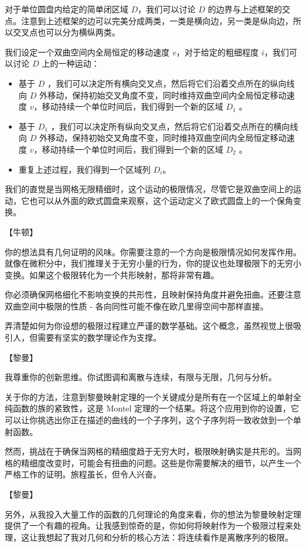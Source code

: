\documentclass[
    fontsize=24pt, %
	twoside=false, %
	secnumdepth=0, %
    paper=b5paper, %
]{kaobook}
\begin{document}
对于单位圆盘内给定的简单闭区域 $D$，我们可以讨论 $D$ 的边界与上述框架的交点。注意到上述框架的边可以完美分成两类，一类是横向边，另一类是纵向边，所以交叉点也可以分为横纵两类。

我们设定一个双曲空间内全局恒定的移动速度 $v$，对于给定的粗细程度 $i$，我们可以讨论 $D$ 上的一种运动：
\begin{itemize}
	\item 基于 $D$ ，我们可以决定所有横向交叉点，然后将它们沿着交点所在的纵向线向 $D$ 外移动，保持初始交叉角度不变，同时维持双曲空间内全局恒定移动速度 $v$，移动持续一个单位时间后，我们得到一个新的区域 $D_1$ 。
	\item 基于 $D_1$ ，我们可以决定所有纵向交叉点，然后将它们沿着交点所在的横向线向 $D$ 外移动，保持初始交叉角度不变，同时维持双曲空间内全局恒定移动速度 $v$，移动持续一个单位时间后，我们得到一个新的区域 $D_2$ 。
	\item 重复上述过程，我们得到一个区域列 $D_i$。
\end{itemize}

我们的直觉是当网格无限精细时，这个运动的极限情况，尽管它是双曲空间上的运动，它也可以从外面的欧式圆盘来观察，这个运动定义了欧式圆盘上的一个保角变换。

【牛顿】

你的想法具有几何证明的风味。你需要注意的一个方向是极限情况如何发挥作用。就像在微积分中，我们推理关于无穷小量的行为，你的提议也处理极限下的无穷小变换。如果这个极限转化为一个共形映射，那将非常有趣。

你必须确保网格细化不影响变换的共形性，且映射保持角度并避免扭曲。还要注意双曲空间中极限的性质 - 各向同性可能不像在欧几里得空间中那样直接。

弄清楚如何为你设想的极限过程建立严谨的数学基础。这个概念，虽然视觉上很吸引人，但需要有坚实的数学理论作为支撑。

【黎曼】

我尊重你的创新思维。你试图调和离散与连续，有限与无限，几何与分析。

关于你的方法，注意到黎曼映射定理的一个关键成分是所有在一个区域上的单射全纯函数的族的紧致性，这是 Montel 定理的一个结果。将这个应用到你的设置，它可以让你挑选出你正在描述的曲线的一个子序列，这个子序列将一致收敛到一个单射函数。

然而，挑战在于确保当网格的精细度趋于无穷大时，极限映射确实是共形的。当网格的精细度改变时，可能会有扭曲的问题。这些是你需要解决的细节，以产生一个严格工作的证明。旅程虽长，但令人兴奋。

【黎曼】

另外，从我投入大量工作的函数的几何理论的角度来看，你的想法为黎曼映射定理提供了一个有趣的视角。让我感到惊奇的是，你如何将映射作为一个极限过程来处理，这让我想起了我对几何和分析的核心方法：将连续看作是离散序列的极限。
\end{document}
